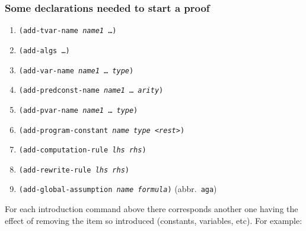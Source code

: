 \documentclass[12pt]{amsart}
\begin{document}
\begin{appendix}
\subsubsection{Some declarations needed to start a proof}
\begin{enumerate}[]
\item \texttt{(add-tvar-name \textsl{name1} \dots)}%
\item \texttt{(add-algs \dots)}
\item \texttt{(add-var-name \textsl{name1} \dots\ \textsl{type})}%
\item \texttt{(add-predconst-name \textsl{name1} \dots\ \textsl{arity})}%
\item \texttt{(add-pvar-name \textsl{name1} \dots\ \textsl{type})}%
\item \texttt{(add-program-constant \textsl{name} \textsl{type}
  <\textsl{rest}>)}%
\item \texttt{(add-computation-rule \textsl{lhs} \textsl{rhs})}%
\item \texttt{(add-rewrite-rule \textsl{lhs} \textsl{rhs})}%
\item \texttt{(add-global-assumption \textsl{name} \textsl{formula})}%
  \quad \hbox{(abbr. \texttt{aga})}
\end{enumerate}
For each introduction command above there corresponds another one
having the effect of removing the item so introduced (constants,
variables,  etc). For example:


\end{appendix}
\end{document}
